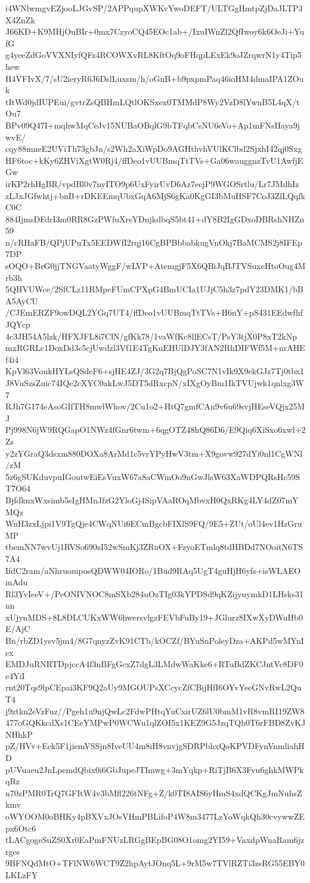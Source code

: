 i4WNlwmgvEZjooLJGvSP/2APPqupXWKvYwoDEFT/ULTGgHmtpZjDaJLTP3X4ZnZk
J66KD+K9MHjOuBIr+0mx7CzyoCQ45EOc1ab+/IxuIWnZl2QfIwoy6k6OeJi+YufG
g4yeeZdGoVVXNIyfQFz4RCOWXvRL8KftOq9oFHqpLExEk9oJZrqwrN1y4Tip5hew
H4VFIvX/7/sU2ieryR6J6DslLuxsm/h/oGnB+b9pxpmPaq46ioHM4dmaIPA1ZOuk
tItWd0jdIUPEui/gvtrZsQBHmLQtlOKSxex0TMMdP8Wy2VzD8lYwnB5L4qX/tOu7
BPv09Q47I+mqhwMqCeJv15NUBaOBqlG9bTFqbCsNU6eVo+Ap1mFNsIIaya9jwvE/
cqy88mneE2UViTh73gbJn/s2Wh2aXiWpDo9AGHthvhVUlKClbd2SjxhI42qj0Sxg
HF6toc+kKy6ZHViXgtW0Rj4/ffDeo1vUUBmqTtTVs+Ga06wauggnzTvU1AwfjEGw
irKP2rhHgBR/vpdBl0v7nyITO9p6UxFyirUvD6Az7ecjP9WGOSrtlu/Lr7JMdhIz
zLJxJGfwhtj+bnB+rDKEEmqUbxGqA6MjS6gKa0KgGI3bMuHSF7CoJ3ZlLQqfkC0C
884IjmsDFdrI3m0RR8GzPWfuXrsYDnjkdbqS5bt41+dY8B2IgGDxoDBRshNHZn59
n/cRHaFB/QPjUPuTx5EEDWfI2rqj16CgBPBbbabkugVnOkj7BaMCMS2j8IFEp7DP
sOQO+BrG0jjTNGVaatyWggF/wLVP+AtemgjF5X6QBiJqBJTVSuxeHtoOug4Mrb3h
5QHVUWce/2SfCLz11RMpeFUmCPXpG4BmUCIa1UJjC5h3z7pdY23DMK1/bBA5AyCU
/CJEmERZF9owDQL2YGq7UT4/ffDeo1vUUBmqTtTVs+H6nY+pS431EEdwfhfJQYcp
4c3JH54A5lzk/HFXJFL8i7ClN/gfKk78/1vaWfKc8llECsT/PsY3tjX0P8xT2kNp
mxRGRLc1DoxDd3c5cjUwdzl3Vf1E4TgKuEHUlDJY3fAN2RhDIFWf5M+nrAHEf4i4
KpVl63VoukHYLsQSdeF6+sjHE4ZJ/3G2q7BjQgPoSC7N1vIk9X9ekGJz7Tj0tbx1
J8VuSzsZuic74IQe2cXYC0akLwJ5DT5dRxcpN/xIXgOyBm1IkTVUjwk1qnlxg3W7
RJh7G174eAsoGIfTH8mwlWhov/2Cu1o2+HtQ7gmfCAn9v6u69svjHEseVQjx25MJ
Pj998N6jW9RQGapO1NWz4fGnr6twm+6qgOTZ48hQ86D6/E9Qiq6XiSxo6xwl+2Zs
y2zYGraQ3dsxm880DOXa8ArMd1c5vrYPyHwV3tm+X9govw927dYi0nl1CgWNl/zM
5z6gSUKduvpuIGoutwEiEsVuxW67a8aCWmOo9nGwJlsW63XaWDPQRsHc59ST7O64
BjfdknxWxsimb5sIgHMnJfzG2YloGj4SipVAaROqMbvxH0QxRKg4LY4dZ07mYMQz
WnH3zxLjpi1V9TgQje4CWqNUi6ECmBgcbFIXlS9FQ/9E5+ZUt/oUl4ev1HzGruMP
tbemNN7wvUj1RVSo690zI52wSmKj3ZRuOX+FzyoETmlq8tdHBDd7NOoitN6TS7A4
IfdC2ram/aNhruomposQDWW04IORo/1Bud9RAq5UgT4guHjH6yfs+isWLAEOmAdu
Rl3YvIeeV+/PeONIVNOC8mSXb284uOzTIg03kYPDSd9qKZijyuymkD1LHsks31nn
xUjynMDS+8L8DLCUKxWW6hwersvlgzFEVbFuBy19+JGlurz8IXwXyDWuHb0E/AjC
Bn/rbZD1ysv5jm4/8G7qnyzZvK91CTb/kOCZf/BYuSnPoleyDza+AKPd5wMYnIex
EMDJuRNRTDpjccA4f3nBFgGcxZ7dgL3LMdwWaKke6+RTuBdZKCJntVc8DF0c4YiI
rnt20Tqs9lpCEpai3KF9Q2aUy9MGOUPsXCcycZfCBijHfI6OYvYeeGNvRwL2QuT4
j9ztkn2eVzFuz//Pgeh1u9njQwLc2FdwPHtqYuCxirUZ6lU0bmM1vR8vmRI19ZW8
477oGQKkcdXs1CEeYMPwP0WCWu1qlZOI5x1KEZ9G5JzqTQh0T6rFBD8ZvKJNHhkP
pZ/HVv+Eck5F1jiemVSSjn8IveUU4m8iH8vnvjgSDRPbhxQoKPVDFynVnmliahHD
pUVuaeu2JnLpemdQbix0i6GbJupeJTImwg+3mYqkp+RiTjB6X3Fvu6ghkMWPkqRz
n70zPMR0TrQ7GFItW4v3bMfl226tNFg+Z/k0TI8AIS6yHmS4xdQCKgJmNuhsZkmv
oWYOOM0oBHKy4pBXVxJOsVHmPBLifoP4W8m3477LzYoWqkQh30cvywwZEpx6Otc6
tLACgogeSuZS0Xr0EaPmFNUzLRGgBEpBG08O1omg2YI59+VaxdpWnaRam6jzrges
9BFNQdMtO+TFlNW6WCT9Z2hpAytJOnq5L+9rM5w7TVlRZTi3zsRG55EBY0LKLzFY
